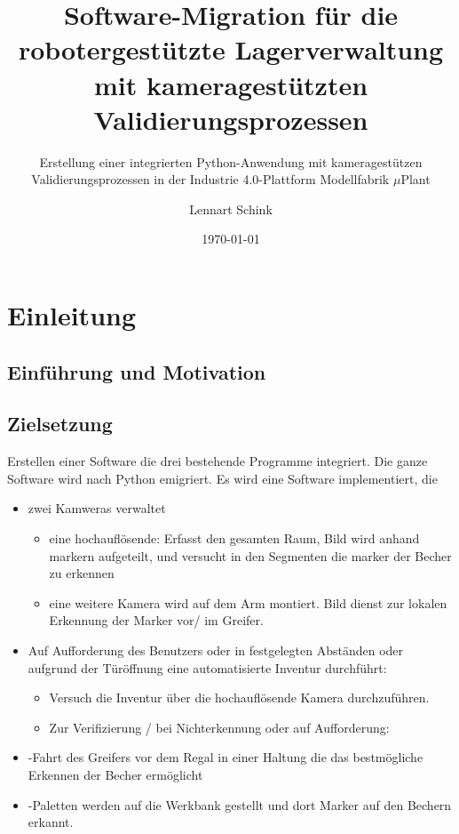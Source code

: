 \documentclass[11pt]{scrartcl}
\title{Software-Migration für die robotergestützte Lagerverwaltung mit kameragestützten Validierungsprozessen}
\subtitle{Erstellung einer integrierten Python-Anwendung mit kameragestützen Validierungsprozessen in der Industrie 4.0-Plattform Modellfabrik $\mu$Plant}
\author{Lennart Schink}
\date{\today}
\begin{document}
    \maketitle
    \tableofcontents
    \newpage

    \section{Einleitung}

    \subsection{Einführung und Motivation}

    \subsection{Zielsetzung}
    Erstellen einer Software die drei bestehende Programme integriert. Die ganze Software wird nach Python emigriert.
    Es wird eine Software implementiert, die
    \begin{itemize}
    \item zwei Kamweras verwaltet
    \begin{itemize}
        \item  eine hochauflösende: Erfasst den gesamten Raum, Bild wird anhand markern aufgeteilt, und versucht in den Segmenten die marker der Becher zu erkennen
        \item  eine weitere Kamera wird auf dem Arm montiert. Bild dienst zur lokalen Erkennung der Marker vor/ im Greifer.
    \end{itemize}
    \item Auf Aufforderung des Benutzers oder in festgelegten Abständen oder aufgrund der Türöffnung eine automatisierte Inventur durchführt:
    \begin{itemize}
        \item  Versuch die Inventur über die hochauflösende Kamera durchzuführen.
        \item  Zur Verifizierung / bei Nichterkennung oder auf Aufforderung:
    \end{itemize}
    \item -Fahrt des Greifers vor dem Regal in einer Haltung die das bestmögliche Erkennen der Becher ermöglicht
    \item -Paletten werden auf die Werkbank gestellt und dort Marker auf den Bechern erkannt.
    \end{itemize}
\end{document}
